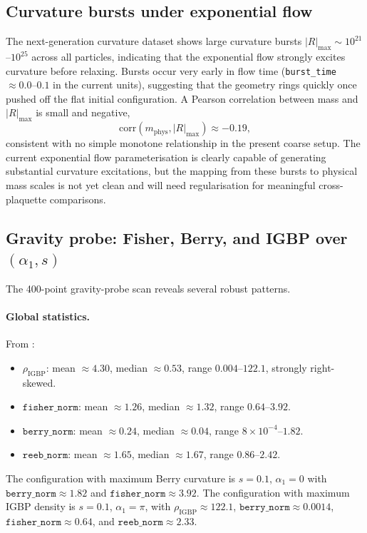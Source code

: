 \documentclass[12pt]{article}
\begin{document}
\subsection{Curvature bursts under exponential flow}
The next-generation curvature dataset \cite{nextgen-curvature-exponential-20251201} shows large curvature bursts $\lvert R\rvert_{\max} \sim 10^{21}$--$10^{25}$ across all particles, indicating that the exponential flow strongly excites curvature before relaxing. Bursts occur very early in flow time (\texttt{burst\_time} $\approx 0.0$--$0.1$ in the current units), suggesting that the geometry rings quickly once pushed off the flat initial configuration. A Pearson correlation between mass and $\lvert R\rvert_{\max}$ is small and negative,
\[
   \mathrm{corr}(m_{\mathrm{phys}}, \lvert R\rvert_{\max}) \approx -0.19,
\]
consistent with no simple monotone relationship in the present coarse setup. The current exponential flow parameterisation is clearly capable of generating substantial curvature excitations, but the mapping from these bursts to physical mass scales is not yet clean and will need regularisation for meaningful cross-plaquette comparisons.

\subsection{Gravity probe: Fisher, Berry, and IGBP over \texorpdfstring{$(\alpha_1, s)$}{(alpha1, s)}}
The 400-point gravity-probe scan reveals several robust patterns.

\paragraph{Global statistics.} From \cite{gravity-probe-results-20251201}:
\begin{itemize}
    \item $\rho_{\mathrm{IGBP}}$: mean $\approx 4.30$, median $\approx 0.53$, range $0.004$--$122.1$, strongly right-skewed.
    \item $\texttt{fisher\_norm}$: mean $\approx 1.26$, median $\approx 1.32$, range $0.64$--$3.92$.
    \item $\texttt{berry\_norm}$: mean $\approx 0.24$, median $\approx 0.04$, range $8\times 10^{-4}$--$1.82$.
    \item $\texttt{reeb\_norm}$: mean $\approx 1.65$, median $\approx 1.67$, range $0.86$--$2.42$.
\end{itemize}
The configuration with maximum Berry curvature is $s = 0.1$, $\alpha_1 = 0$ with $\texttt{berry\_norm} \approx 1.82$ and $\texttt{fisher\_norm} \approx 3.92$. The configuration with maximum IGBP density is $s = 0.1$, $\alpha_1 = \pi$, with $\rho_{\mathrm{IGBP}} \approx 122.1$, $\texttt{berry\_norm} \approx 0.0014$, $\texttt{fisher\_norm} \approx 0.64$, and $\texttt{reeb\_norm} \approx 2.33$.
\end{document}
